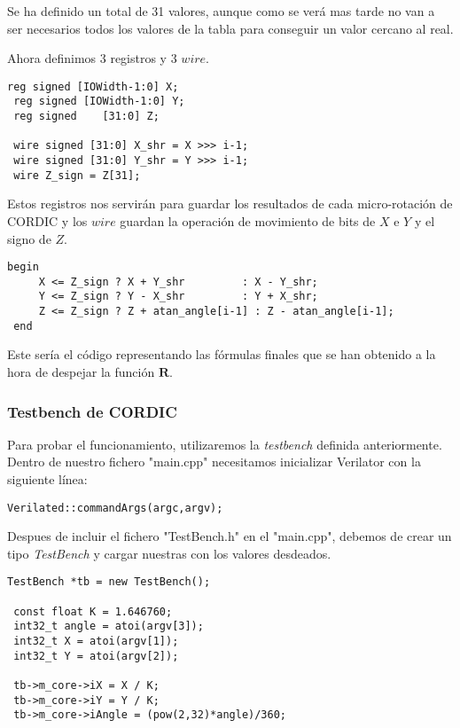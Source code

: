 Se ha definido un total de 31 valores, aunque como se verá mas tarde no van a ser necesarios todos los valores de la tabla para conseguir un valor cercano al real.

Ahora definimos 3 registros y 3 $wire$.

\begin{lstlisting}[caption={Registros y $wire$ para operar con CORDIC}]
 reg signed [IOWidth-1:0] X;
 reg signed [IOWidth-1:0] Y;
 reg signed    [31:0] Z; 
 
 wire signed [31:0] X_shr = X >>> i-1;
 wire signed [31:0] Y_shr = Y >>> i-1;
 wire Z_sign = Z[31];  
\end{lstlisting}

Estos registros nos servirán para guardar los resultados de cada micro-rotación de CORDIC y los $wire$ guardan la operación de movimiento de bits de $X$ e $Y$ y el signo de $Z$.

\begin{lstlisting}[caption={Bucle principal de CORDIC}]
 begin
     X <= Z_sign ? X + Y_shr         : X - Y_shr;
     Y <= Z_sign ? Y - X_shr         : Y + X_shr;
     Z <= Z_sign ? Z + atan_angle[i-1] : Z - atan_angle[i-1];
 end
\end{lstlisting}

Este sería el código representando las fórmulas finales que se han obtenido a la hora de despejar la función $\textbf{R}$.

\subsubsection{Testbench de CORDIC}
Para probar el funcionamiento, utilizaremos la \textit{testbench} definida anteriormente. Dentro de nuestro fichero "main.cpp" necesitamos inicializar Verilator con la siguiente línea:

\begin{lstlisting}
Verilated::commandArgs(argc,argv);
\end{lstlisting}

Despues de incluir el fichero "TestBench.h" en el "main.cpp", debemos de crear un tipo \textit{TestBench} y cargar nuestras con los valores desdeados.

\begin{lstlisting}[caption={Creación del tipo TestBench y entrada de valores desde C++ al módulo de CORDIC en Verilog}]
 TestBench *tb = new TestBench();

 const float K = 1.646760;
 int32_t angle = atoi(argv[3]);
 int32_t X = atoi(argv[1]);
 int32_t Y = atoi(argv[2]);

 tb->m_core->iX = X / K;
 tb->m_core->iY = Y / K;
 tb->m_core->iAngle = (pow(2,32)*angle)/360;
\end{lstlisting} 

